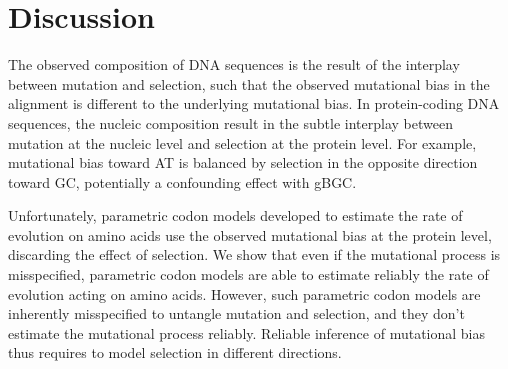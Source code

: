 \begin{table}[htbp]
    \centering
    \noindent{}
    \caption[Estimated parameters]{
    Estimated parameters
    Nucleoprotein alignment of 498 amino acids available for 180 species (left column).
    Lactamase alignment of 263 amino acids available for 85 species (right column).
    }
    \label{tab:mut-bias-estimation}
\end{table}


\section{Discussion}\label{sec:discussion}

The observed composition of \acrshort{DNA} sequences is the result of the interplay between mutation and selection, such that the observed mutational bias in the alignment is different to the underlying mutational bias.
In protein-coding \acrshort{DNA} sequences, the nucleic composition result in the subtle interplay between mutation at the nucleic level and selection at the protein level.
For example, mutational bias toward AT is balanced by selection in the opposite direction toward GC, potentially a confounding effect with \acrshort{gBGC}.

Unfortunately, parametric codon models developed to estimate the rate of evolution on amino acids use the observed mutational bias at the protein level, discarding the effect of selection.
We show that even if the mutational process is misspecified, parametric codon models are able to estimate reliably the rate of evolution acting on amino acids.
However, such parametric codon models are inherently misspecified to untangle mutation and selection, and they don't estimate the mutational process reliably.
Reliable inference of mutational bias thus requires to model selection in different directions.

